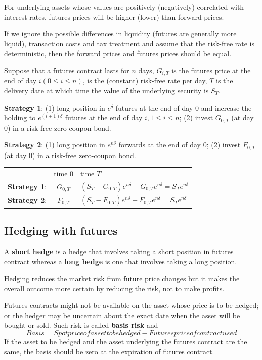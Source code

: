 \documentclass[11pt,a4paper]{book}
\theoremstyle{definition}\newtheorem{definition}{Definition}
\theoremstyle{definition}\newtheorem{fact}{Fact}
\theoremstyle{definition}\newtheorem{remark}{Remark}
\theoremstyle{definition}\newtheorem{ex}{Ex.}
\theoremstyle{definition}\newtheorem{project}{Project}
\theoremstyle{definition}\newtheorem{problem}{Problem}
\theoremstyle{definition}\newtheorem{example}{Example}
\numberwithin{theorem}{section}
\numberwithin{corollary}{chapter}
\numberwithin{assumption}{chapter}
\numberwithin{definition}{chapter}
\numberwithin{prop}{chapter}
\numberwithin{notation}{chapter}
\numberwithin{problem}{chapter}
\numberwithin{example}{chapter}
\numberwithin{fact}{chapter}
\numberwithin{ex}{chapter}
\begin{document}
For underlying assets whose values are positively (negatively) correlated with interest rates, futures prices will be higher (lower) than forward prices.

If we ignore the possible differences in liquidity (futures are generally more liquid), transaction costs and tax treatment and assume that the risk-free rate is deterministic, then the forward prices and futures prices should be equal.

Suppose that a futures contract lasts for $n$ days, $G_{i,T}$ is the futures price at the end of day $i (0 \leq i \leq n)$, is the (constant) risk-free rate per day, $T$ is the delivery date at which time the value of the underlying security is $S_T$.

\textbf{Strategy 1}: (1) long position in $e^{\delta}$ futures at the end of day 0 and increase the holding to $e^{(i+1)\delta}$ futures at the end of day $i, 1 \leq i \leq n$; (2) invest $G_{0,T}$ (at day 0) in a risk-free zero-coupon bond.

\textbf{Strategy 2}: (1) long position in $e^{n \delta}$ forwards at the end of day 0; (2) invest $F_{0,T}$ (at day 0) in a risk-free zero-coupon bond.

\begin{table}[H]
\centering
\begin{tabular}{ccl}
 & time 0 & time $T$ \\
\textbf{Strategy 1}: & $G_{0,T}$ & $(S_T-G_{0,T})e^{n \delta} + G_{0,T}e^{n \delta} = S_T e^{n \delta}$ \\
\textbf{Strategy 2}: & $F_{0,T}$ & $(S_T-F_{0,T})e^{n \delta} + F_{0,T}e^{n \delta} = S_T e^{n \delta}$ \\
\end{tabular}
\end{table}

\subsection{Hedging with futures}
A \textbf{short hedge} is a hedge that involves taking a short position in futures contract whereas a \textbf{long hedge} is one that involves taking a long position.

Hedging reduces the market risk from future price changes but it makes the overall outcome more certain by reducing the risk, not to make profits.

Futures contracts might not be available on the asset whose price is to be hedged; or the hedger may be uncertain about the exact date when the asset will be bought or sold. Such risk is called \textbf{basis risk} and
$$ Basis = Spot price of asset to be hedged - Futures price of contract used $$
If the asset to be hedged and the asset underlying the futures contract are the same, the basis should be zero at the expiration of futures contract.
\end{document}
